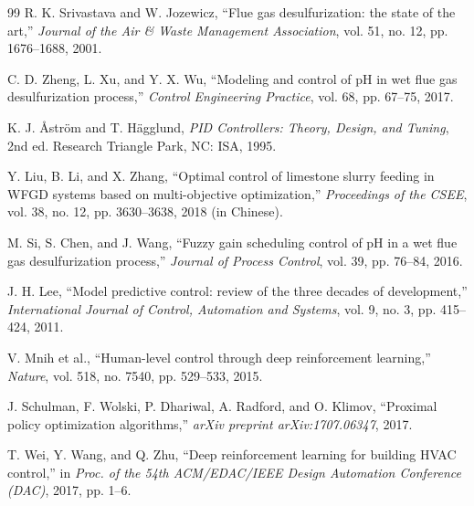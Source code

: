 \documentclass[12pt,a4paper]{article}
\begin{document}
\begin{thebibliography}{99}
 R. K. Srivastava and W. Jozewicz, ``Flue gas desulfurization: the state of the art,'' \textit{Journal of the Air \& Waste Management Association}, vol. 51, no. 12, pp. 1676–1688, 2001.

 C. D. Zheng, L. Xu, and Y. X. Wu, ``Modeling and control of pH in wet flue gas desulfurization process,'' \textit{Control Engineering Practice}, vol. 68, pp. 67–75, 2017.

 K. J. Åström and T. Hägglund, \textit{PID Controllers: Theory, Design, and Tuning}, 2nd ed. Research Triangle Park, NC: ISA, 1995.

 Y. Liu, B. Li, and X. Zhang, ``Optimal control of limestone slurry feeding in WFGD systems based on multi-objective optimization,'' \textit{Proceedings of the CSEE}, vol. 38, no. 12, pp. 3630–3638, 2018 (in Chinese).

 M. Si, S. Chen, and J. Wang, ``Fuzzy gain scheduling control of pH in a wet flue gas desulfurization process,'' \textit{Journal of Process Control}, vol. 39, pp. 76–84, 2016.

 J. H. Lee, ``Model predictive control: review of the three decades of development,'' \textit{International Journal of Control, Automation and Systems}, vol. 9, no. 3, pp. 415–424, 2011.

 V. Mnih et al., ``Human-level control through deep reinforcement learning,'' \textit{Nature}, vol. 518, no. 7540, pp. 529–533, 2015.

 J. Schulman, F. Wolski, P. Dhariwal, A. Radford, and O. Klimov, ``Proximal policy optimization algorithms,'' \textit{arXiv preprint arXiv:1707.06347}, 2017.

 T. Wei, Y. Wang, and Q. Zhu, ``Deep reinforcement learning for building HVAC control,'' in \textit{Proc. of the 54th ACM/EDAC/IEEE Design Automation Conference (DAC)}, 2017, pp. 1–6.

\end{thebibliography}
\end{document}
